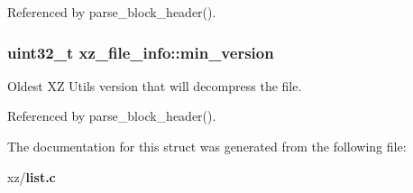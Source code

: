 Referenced by parse\-\_\-block\-\_\-header().

\subsubsection[{min\-\_\-version}]{\setlength{\rightskip}{0pt plus 5cm}uint32\-\_\-t xz\-\_\-file\-\_\-info\-::min\-\_\-version}\label{structxz__file__info_a2a1625c5626e4a1dcc280b952ebb0038}


Oldest X\-Z Utils version that will decompress the file. 



Referenced by parse\-\_\-block\-\_\-header().



The documentation for this struct was generated from the following file\-:\begin{DoxyCompactItemize}
\item 
xz/{\bf list.\-c}\end{DoxyCompactItemize}
